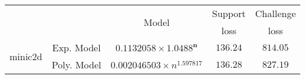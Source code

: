 \begin{tabular}{ccccc} 
\hline 
 &  & \multirow{2}{*}{Model} & Support & Challenge\tabularnewline 
 &  &  & loss  & loss\tabularnewline 
\hline 
\hline 
\multirow{2}{*}{minic2d} & Exp. Model & $\mathbf{0.1132058\times 1.0488^{n}}$ & $\mathbf{136.24}$ & $\mathbf{814.05}$ \tabularnewline 
 & Poly. Model & $0.002046503\times n^{1.597817}$ & $136.28$ & $827.19$ \tabularnewline 
\hline 
\end{tabular} 

